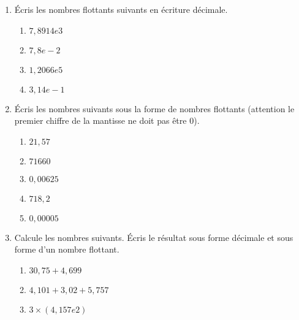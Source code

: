 \documentclass[class=report,crop=false, 12pt]{standalone}
\begin{document}
\begin{activite}
\begin{itemize}
\end{itemize}


\begin{enumerate}
  \item Écris les nombres flottants suivants en écriture décimale.
  \begin{enumerate}
    \item $7,8914e3$
    \item $7,8e-2$
    \item $1,2066e5$
    \item $3,14e-1$
  \end{enumerate}
  
  \item Écris les nombres suivants sous la forme de nombres flottants (attention le premier chiffre de la mantisse ne doit pas être $0$).
  \begin{enumerate}
    \item $21,57$
    \item $71660$
    \item $0,00625$
    \item $718,2$
    \item $0,00005$  
  \end{enumerate}

  \item Calcule les nombres suivants. Écris le résultat sous forme décimale et sous forme d'un nombre flottant.
  \begin{enumerate}
    \item $30,75 + 4,699$
    \item $4,101 + 3,02 + 5,757$
    \item $3 \times (4,157e2)$
  \end{enumerate}
  
 \end{enumerate} 
  
\end{activite}
\end{document}
